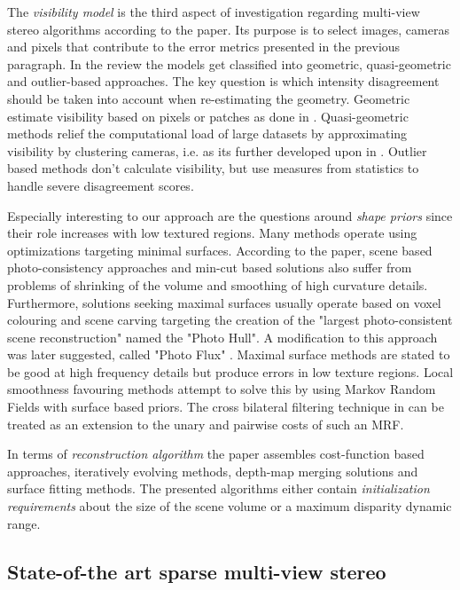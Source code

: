 \documentclass{ucl_thesis}
\begin{document}
\par The {\it visibility model} is the third aspect of investigation regarding multi-view stereo algorithms according to the paper. Its purpose is to select images, cameras and pixels that contribute to the error metrics presented in the previous paragraph. In the review the models get classified into geometric, quasi-geometric and outlier-based approaches. The key question is which intensity disagreement should be taken into account when re-estimating the geometry. Geometric estimate visibility based on pixels or patches as done in \cite{FurukawaP07}. Quasi-geometric methods relief the computational load of large datasets by approximating visibility by clustering cameras, i.e. as its further developed upon in \cite{FurukawaCSS10}. Outlier based methods don't calculate visibility, but use measures from statistics to handle severe disagreement scores.

\par Especially interesting to our approach are the questions around {\it shape priors} since their role increases with low textured regions. Many methods operate using optimizations targeting minimal surfaces. According to the paper, scene based photo-consistency approaches and min-cut based solutions also suffer from problems of shrinking of the volume and smoothing of high curvature details. Furthermore, solutions seeking maximal surfaces usually operate based on voxel colouring and scene carving targeting the creation of the "largest photo-consistent scene reconstruction" named the "Photo Hull". A modification to this approach was later suggested, called "Photo Flux" \cite{boykov2006photohulls}. Maximal surface methods are stated to be good at high frequency details but produce errors in low texture regions. Local smoothness favouring methods attempt to solve this by using Markov Random Fields with surface based priors. The cross bilateral filtering technique in \cite{cvpr-07-qingxiong-yang} can be treated as an extension to the unary and pairwise costs of such an MRF.

\par In terms of {\it reconstruction algorithm} the paper assembles cost-function based approaches, iteratively evolving methods, depth-map merging solutions and surface fitting methods. The presented algorithms either contain {\it initialization requirements} about the size of the scene volume or a maximum disparity dynamic range.

\subsection{State-of-the art sparse multi-view stereo}
\end{document}
